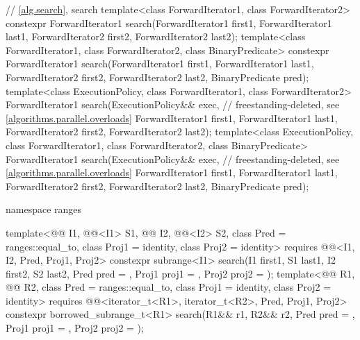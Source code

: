 \begin{codeblock}
{  // \ref{alg.search}, search
  template<class ForwardIterator1, class ForwardIterator2>
    constexpr ForwardIterator1
      search(ForwardIterator1 first1, ForwardIterator1 last1,
             ForwardIterator2 first2, ForwardIterator2 last2);
  template<class ForwardIterator1, class ForwardIterator2, class BinaryPredicate>
    constexpr ForwardIterator1
      search(ForwardIterator1 first1, ForwardIterator1 last1,
             ForwardIterator2 first2, ForwardIterator2 last2,
             BinaryPredicate pred);
  template<class ExecutionPolicy, class ForwardIterator1, class ForwardIterator2>
    ForwardIterator1
      search(ExecutionPolicy&& exec,                            // freestanding-deleted, see \ref{algorithms.parallel.overloads}
             ForwardIterator1 first1, ForwardIterator1 last1,
             ForwardIterator2 first2, ForwardIterator2 last2);
  template<class ExecutionPolicy, class ForwardIterator1, class ForwardIterator2,
           class BinaryPredicate>
    ForwardIterator1
      search(ExecutionPolicy&& exec,                            // freestanding-deleted, see \ref{algorithms.parallel.overloads}
             ForwardIterator1 first1, ForwardIterator1 last1,
             ForwardIterator2 first2, ForwardIterator2 last2,
             BinaryPredicate pred);

  namespace ranges {
    template<@@ I1, @@<I1> S1, @@ I2,
             @@<I2> S2, class Pred = ranges::equal_to,
             class Proj1 = identity, class Proj2 = identity>
      requires @@<I1, I2, Pred, Proj1, Proj2>
      constexpr subrange<I1>
        search(I1 first1, S1 last1, I2 first2, S2 last2, Pred pred = {},
               Proj1 proj1 = {}, Proj2 proj2 = {});
    template<@@ R1, @@ R2, class Pred = ranges::equal_to,
             class Proj1 = identity, class Proj2 = identity>
      requires @@<iterator_t<R1>, iterator_t<R2>, Pred, Proj1, Proj2>
      constexpr borrowed_subrange_t<R1>
        search(R1&& r1, R2&& r2, Pred pred = {},
               Proj1 proj1 = {}, Proj2 proj2 = {});

}}
\end{codeblock}
